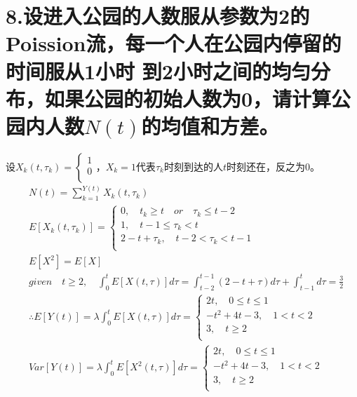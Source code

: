 \documentclass[UTF8]{ctexart}
\begin{document}
\section*{8.设进入公园的人数服从参数为2的Poission流，每一个人在公园内停留的时间服从1小时
  到2小时之间的均匀分布，如果公园的初始人数为0，请计算公园内人数$N(t)$的均值和方差。}
设$X_k(t,\tau_k)=\begin{cases}
    1 \\
    0 \\
  \end{cases}$，$X_k=1$代表$\tau_k$时刻到达的人$t$时刻还在，反之为0。
\begin{equation*}
  \begin{aligned}
     & N(t)=\sum\limits_{k=1}^{Y(t)}X_k(t,\tau_k)                                        \\
     & E[X_k(t,\tau_k)]=\begin{cases}
      0,\quad t_k\geq t\quad or\quad\tau_k\leq t-2 \\
      1,\quad t-1\leq\tau_k<t                      \\
      2-t+\tau_k,\quad t-2<\tau_k<t-1              \\
    \end{cases}                                       \\
     & E[X^2]=E[X]                                                                       \\
     & given\quad t\geq2,\quad\int_0^t E[X(t,\tau)]d\tau=\int_{t-2}^{t-1}(2-t+\tau)d\tau
    +\int_{t-1}^td\tau=\frac{3}{2}                                                       \\
     & \therefore E[Y(t)]=\lambda\int_0^t E[X(t,\tau)]d\tau=
    \begin{cases}
      2t,\quad0\leq t\leq1 \\
      -t^2+4t-3,\quad1<t<2 \\
      3,\quad t\geq2       \\
    \end{cases}                                                           \\
     & Var[Y(t)]=\lambda\int_0^t E[X^2(t,\tau)]d\tau=
    \begin{cases}
      2t,\quad0\leq t\leq1 \\
      -t^2+4t-3,\quad1<t<2 \\
      3,\quad t\geq2       \\
    \end{cases}                                                           \\
  \end{aligned}
\end{equation*}
\end{document}

